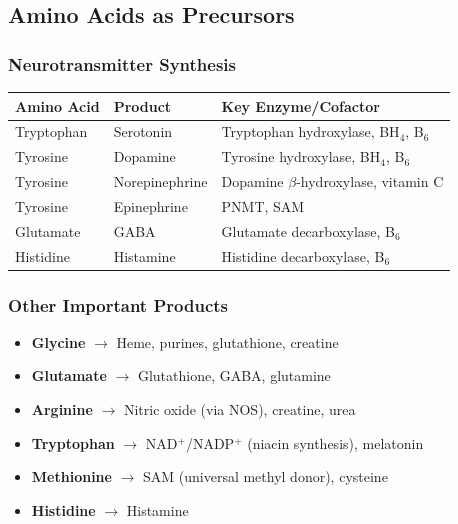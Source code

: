 \subsection{Amino Acids as Precursors}

\subsubsection{Neurotransmitter Synthesis}

\begin{center}
\begin{tabular}{lll}
\toprule
\textbf{Amino Acid} & \textbf{Product} & \textbf{Key Enzyme/Cofactor} \\
\midrule
Tryptophan & Serotonin & Tryptophan hydroxylase, BH$_4$, B$_6$ \\
Tyrosine & Dopamine & Tyrosine hydroxylase, BH$_4$, B$_6$ \\
Tyrosine & Norepinephrine & Dopamine $\beta$-hydroxylase, vitamin C \\
Tyrosine & Epinephrine & PNMT, SAM \\
Glutamate & GABA & Glutamate decarboxylase, B$_6$ \\
Histidine & Histamine & Histidine decarboxylase, B$_6$ \\
\bottomrule
\end{tabular}
\end{center}

\subsubsection{Other Important Products}

\begin{itemize}
    \item \textbf{Glycine} $\rightarrow$ Heme, purines, glutathione, creatine
    \item \textbf{Glutamate} $\rightarrow$ Glutathione, GABA, glutamine
    \item \textbf{Arginine} $\rightarrow$ Nitric oxide (via NOS), creatine, urea
    \item \textbf{Tryptophan} $\rightarrow$ NAD$^+$/NADP$^+$ (niacin synthesis), melatonin
    \item \textbf{Methionine} $\rightarrow$ SAM (universal methyl donor), cysteine
    \item \textbf{Histidine} $\rightarrow$ Histamine
\end{itemize}

